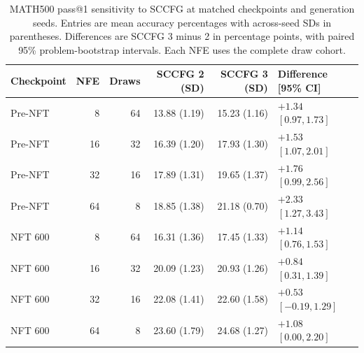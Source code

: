 \begin{table}[htbp]
\caption{MATH500 pass@1 sensitivity to SCCFG at matched checkpoints and generation seeds. Entries are mean accuracy percentages with across-seed SDs in parentheses. Differences are SCCFG 3 minus 2 in percentage points, with paired 95\% problem-bootstrap intervals. Each NFE uses the complete draw cohort.}
\label{tab:mathsccfg3}
\centering\small
\setlength{\tabcolsep}{5pt}
\begin{tabular}{@{}lrrrrl@{}}
\toprule
Checkpoint & NFE & Draws & SCCFG 2 (SD) & SCCFG 3 (SD) & Difference [95\% CI] \\
\midrule
Pre-NFT & 8 & 64 & 13.88 {\scriptsize (1.19)} & 15.23 {\scriptsize (1.16)} & $+1.34$ $[0.97, 1.73]$ \\
Pre-NFT & 16 & 32 & 16.39 {\scriptsize (1.20)} & 17.93 {\scriptsize (1.30)} & $+1.53$ $[1.07, 2.01]$ \\
Pre-NFT & 32 & 16 & 17.89 {\scriptsize (1.31)} & 19.65 {\scriptsize (1.37)} & $+1.76$ $[0.99, 2.56]$ \\
Pre-NFT & 64 & 8 & 18.85 {\scriptsize (1.38)} & 21.18 {\scriptsize (0.70)} & $+2.33$ $[1.27, 3.43]$ \\
\midrule
NFT 600 & 8 & 64 & 16.31 {\scriptsize (1.36)} & 17.45 {\scriptsize (1.33)} & $+1.14$ $[0.76, 1.53]$ \\
NFT 600 & 16 & 32 & 20.09 {\scriptsize (1.23)} & 20.93 {\scriptsize (1.26)} & $+0.84$ $[0.31, 1.39]$ \\
NFT 600 & 32 & 16 & 22.08 {\scriptsize (1.41)} & 22.60 {\scriptsize (1.58)} & $+0.53$ $[-0.19, 1.29]$ \\
NFT 600 & 64 & 8 & 23.60 {\scriptsize (1.79)} & 24.68 {\scriptsize (1.27)} & $+1.08$ $[0.00, 2.20]$ \\
\bottomrule
\end{tabular}
\end{table}
